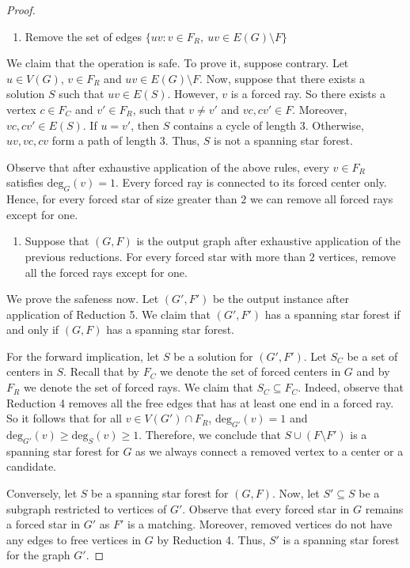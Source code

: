 \documentclass[en]{pracamgr}
\theoremstyle{definition}
\newcommand{\ssf}{spanning star forest}
\newcommand{\degree}[2]{\textrm{deg}_{#1}(#2)}
\begin{document}
\begin{proof}
	\begin{enumerate}[leftmargin=*,label=\textbf{Reduction \arabic{enumi}},resume,wide, labelwidth=!, labelindent=0pt]
		\item Remove the set of edges $\{uv: v \in F_R,\ uv \in E(G) \setminus F\}$
	\end{enumerate}
	We claim that the operation is safe. To prove it, suppose contrary. Let $u \in V(G)$, $v \in F_R$ and $uv \in E(G) \setminus F$. Now, suppose that there exists a solution $S$ such that $uv \in E(S)$. However, $v$ is a forced ray. So there exists a vertex $c \in F_C$ and $v' \in F_R$, such that $v \neq v'$ and $vc,cv' \in F$. Moreover, $vc,cv' \in E(S)$. If $u=v'$, then $S$ contains a cycle of length $3$. Otherwise, $uv,vc,cv$ form a path of length $3$. Thus, $S$ is not a spanning star forest.

	Observe that after exhaustive application of the above rules, every $v \in F_R$ satisfies $\degree{G}{v}=1$. Every forced ray is connected to its forced center only. Hence, for every forced star of size greater than $2$ we can remove all forced rays except for one.


	\begin{enumerate}[leftmargin=*,label=\textbf{Reduction \arabic{enumi}},resume,wide, labelwidth=!, labelindent=0pt]
		\item Suppose that $(G,F)$ is the output graph after exhaustive application of the previous reductions. For every forced star with more than $2$ vertices, remove all the forced rays except for one.
	\end{enumerate}

	We prove the safeness now. Let $(G',F')$ be the output instance after application of Reduction 5. We claim that $(G',F')$ has a \ssf{} if and only if $(G,F)$ has a \ssf{}. 
	
	For the forward implication, let $S$ be a solution for $(G',F')$. Let $S_C$ be a set of centers in $S$. Recall that by $F_C$ we denote the set of forced centers in $G$ and by $F_R$ we denote the set of forced rays. We claim that $S_C \subseteq F_C$. Indeed, observe that Reduction 4 removes all the free edges that has at least one end in a forced ray. So it follows that for all $v \in V(G') \cap F_R$, $\degree{G'}{v}=1$ and $\degree{G'}{v} \geq \degree{S}{v} \geq 1$. Therefore, we conclude that $S \cup (F \setminus F')$ is a spanning star forest for $G$ as we always connect a removed vertex to a center or a candidate.
	
	Conversely, let $S$ be a spanning star forest for $(G,F)$. Now, let $S' \subseteq S$ be a subgraph restricted to vertices of $G'$. Observe that every forced star in $G$ remains a forced star in $G'$ as $F'$ is a matching. Moreover, removed vertices do not have any edges to free vertices in $G$ by Reduction 4. Thus, $S'$ is a spanning star forest for the graph $G'$.


\end{proof}
\end{document}
